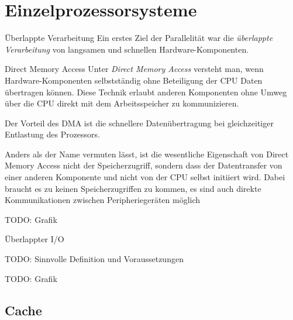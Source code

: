 
\section{Einzelprozessorsysteme}

\begin{defi}{Überlappte Verarbeitung}
  Ein erstes Ziel der Parallelität war die \emph{überlappte Verarbeitung} von langsamen und schnellen Hardware-Komponenten.
\end{defi}

\begin{example}{Direct Memory Access}
  Unter \emph{Direct Memory Access} versteht man, wenn Hardware-Komponenten selbstständig ohne Beteiligung der CPU Daten übertragen können.
  Diese Technik erlaubt anderen Komponenten ohne Umweg über die CPU direkt mit dem Arbeitsspeicher zu kommunizieren.

  Der Vorteil des DMA ist die schnellere Datenübertragung bei gleichzeitiger Entlastung des Prozessors.

  Anders als der Name vermuten lässt, ist die wesentliche Eigenschaft von Direct Memory Access nicht der Speicherzugriff, sondern dass der Datentransfer von einer anderen Komponente und nicht von der CPU selbst initiiert wird. Dabei braucht es zu keinen Speicherzugriffen zu kommen, es sind auch direkte Kommunikationen zwischen Peripheriegeräten möglich

  TODO: Grafik
\end{example}

\begin{defi}{Überlappter I/O}

  TODO: Sinnvolle Definition und Voraussetzungen

  TODO: Grafik
\end{defi}

\subsection{Cache}


